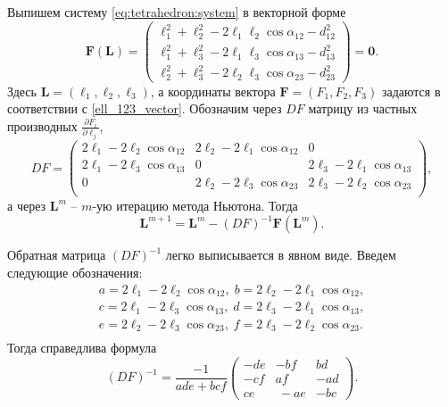 \documentclass[../main.tex]{subfiles}
\begin{document}
Выпишем систему \eqref{eq:tetrahedron:system} в векторной форме
\begin{equation}\label{ell_123_vector}
  \mathbf{F} (\mathbf{L})=
  \left(
    \begin{array}{c}
      \ell_1^2+\ell_2^2-2 \ell_1 \ell_2 \cos \alpha_{12} - d_{12}^2 \\
      \ell_1^2+\ell_3^2-2 \ell_1 \ell_3 \cos \alpha_{13} - d_{13}^2 \\
      \ell_2^2+\ell_3^2-2 \ell_2 \ell_3 \cos \alpha_{23} - d_{23}^2
    \end{array}
  \right)
  =\mathbf{0}.
\end{equation}
Здесь $\mathbf{L}=(\ell_1,\ell_2,\ell_3)$, а координаты вектора $\mathbf{F}=(F_1,F_2,F_3)$ задаются в соответствии с \eqref {ell_123_vector}. Обозначим через  $DF$ матрицу из частных производных $\frac {\partial F_i} {\partial \ell_j}$,
\begin{equation}
DF=
\left(
  \begin{array}{ccc}
    2\ell_1 - 2\ell_2 \cos \alpha_{12} & 2\ell_2 - 2\ell_1 \cos \alpha_{12} & 0  \\
    2\ell_1 - 2\ell_3 \cos \alpha_{13} & 0 & 2\ell_3 - 2\ell_1 \cos \alpha_{13}  \\
    0 & 2\ell_2 - 2\ell_3 \cos \alpha_{23} & 2\ell_3 - 2\ell_2 \cos \alpha_{23}  \\
  \end{array}
\right),
\label {DF}
\end{equation}
а через $\mathbf{L}^m$ -- $m$-ую итерацию метода Ньютона. Тогда
\begin{equation}
  \mathbf{L}^{m+1}=\mathbf{L}^{m} - (DF)^{-1} \mathbf{F}(\mathbf{L}^{m}).
\label {Newton_vector}
\end{equation}

Обратная матрица $(DF)^{-1}$ легко выписывается в явном виде. Введем следующие обозначения:
\begin {equation}
  \begin {matrix}
   a= 2\ell_1 - 2\ell_2 \cos \alpha_{12}, \; b= 2\ell_2 - 2\ell_1 \cos \alpha_{12}, \\
   c= 2\ell_1 - 2\ell_3 \cos \alpha_{13}, \; d= 2\ell_3 - 2\ell_1 \cos \alpha_{13}, \\
   e= 2\ell_2 - 2\ell_3 \cos \alpha_{23}, \; f= 2\ell_3 - 2\ell_2 \cos \alpha_{23}. \\
  \end {matrix}
  \label {abc}
\end {equation}
Тогда справедлива формула
\begin{equation}
  (DF)^{-1} = \frac {-1} {ade+bcf}
  \left(
    \begin{array}{ccc}
      -de & -bf & bd \\
      -cf &  af & -ad \\
      ce  &\ -ae & -bc
    \end{array}
  \right) .
\label {DF_m1}
\end{equation}
\end{document}
